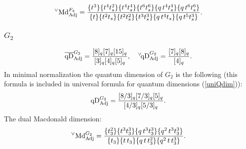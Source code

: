 \documentclass{article}
\def\MD{\hbox{Md}}%
\def\qDv{{^\vee\!\hbox{qD}}}
\def\qD{\hbox{qD}}
\def\MD{\hbox{Md}}%
\def\qDv{{^\vee\!\hbox{qD}}}
\def\qD{\hbox{qD}}
\def\Adj{\text{Adj}}
\begin{document}
\begin{equation}
    ^{\vee}\MD_{\Adj}^{F_4} = \frac{\{t^3\} \{t^4 t_s^2\} \{t^4
   t_s^4\}\{t^6 t_s^6\} \{q\, t^4
   t_s^4\} \{q \, t^6 t_s^6\}}{\{t\}  \{t^2 t_s\} \{t^2
   t_s^2\} \{t^3 t_s^3\} \{q\, t^4
   t_s\} \{q \,t^5 t_s^3\}}.
\end{equation}

\subsubsection{$G_2$}
\begin{equation}
    \overline{\qD}_{\Adj}^{G_2} = \frac{[8]_q[7]_q[15]_q}{[3]_q[4]_q[5]_q}, \quad \qDv_{\Adj}^{G_2} = \frac{[7]_q[8]_q}{[4]_q}.
\end{equation}
In minimal normalization the quantum dimension of $G_2$ is the following (this formula is included in universal formula for quantum dimensions (\ref{uniQdim})):
\begin{equation}
    \qD_{\Adj}^{G_2} = \frac{[8/3]_q[7/3]_q[5]_q}{[4/3]_q[5/3]_q}.
\end{equation}
The dual Macdonald dimension:
\begin{equation}
   ^{\vee}\MD^{G_2}_{\Adj} = \frac{\{t_3^2\} \{t^3 t_3^3\} \{q\,
   t^3 t_3^3\} \{q^2\, t^3 t_3^3\}}{
   \{t_3\} \{t\, t_3\} \{q \, t\,
   t_3^2\} \{q^2\, t \,t_3^3\}}.
\end{equation}

\end{document}
